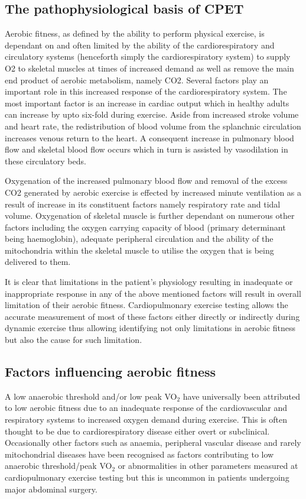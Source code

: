 \subsection{The pathophysiological basis of CPET}
Aerobic fitness, as defined by the ability to perform physical exercise, is dependant on and often limited by the ability of the cardiorespiratory and circulatory systems (henceforth simply the cardiorespiratory system) to supply O2 to skeletal muscles at times of increased demand as well as remove the main end product of aerobic metabolism, namely CO2. Several factors play an important role in this increased response of the cardiorespiratory system. The most important factor is an increase in cardiac output which in healthy adults can increase by upto six-fold during exercise. Aside from increased stroke volume and heart rate, the redistribution of blood volume from the splanchnic circulation increases venous return to the heart. A consequent increase in pulmonary blood flow and skeletal blood flow occurs which in turn is assisted by vasodilation in these circulatory beds.

Oxygenation of the increased pulmonary blood flow and removal of the excess CO2 generated by aerobic exercise is effected by increased minute ventilation as a result of increase in its constituent factors namely respiratory rate and tidal volume. Oxygenation of skeletal muscle is further dependant on numerous other factors including the oxygen carrying capacity of blood (primary determinant being haemoglobin), adequate peripheral circulation and the ability of the mitochondria within the skeletal muscle to utilise the oxygen that is being delivered to them. 

It is clear that limitations in the patient's physiology resulting in inadequate or inappropriate response in any of the above mentioned factors will result in overall limitation of their aerobic fitness. Cardiopulmonary exercise testing allows the accurate measurement of most of these factors either directly or indirectly during dynamic exercise thus allowing identifying not only limitations in aerobic fitness but also the cause for such limitation. 

\subsection{Factors influencing aerobic fitness}
A low anaerobic threshold and/or low peak VO$_2$ have universally been attributed to low aerobic fitness due to an inadequate response of the cardiovascular and respiratory systems to increased oxygen demand during exercise. This is often thought to be due to cardiorespiratory disease either overt or subclinical. Occasionally other factors such as anaemia, peripheral vascular disease and rarely mitochondrial diseases have been recognised as factors contributing to low anaerobic threshold/peak VO$_2$ or abnormalities in other parameters measured at cardiopulmonary exercise testing but this is uncommon in patients undergoing major abdominal surgery.

